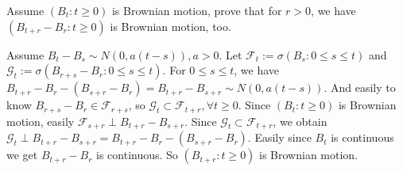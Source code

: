 \documentclass{ctexart}
\begin{document}
\begin{problem}\label{pro:1}
  Assume \((B_t:t \geq 0)\) is Brownian motion, prove that for \(r>0\), we have \((B_{t + r}-B_r:t \geq 0)\) is Brownian motion, too.
\end{problem}
\begin{solution}
  Assume \(B_t-B_s \sim N(0,a(t-s)),a >0\).
  Let \(\mathcal{F}_t:=\sigma(B_s:0 \leq s \leq t)\) and \(\mathcal{G}_t:=\sigma(B_{r+s}-B_r:0 \leq s \leq t)\).
  For \(0 \leq s \leq t\), we have \(B_{t+r}-B_r -(B_{s+r}-B_r)=B_{t+r}-B_{s+r} \sim N(0,a(t-s))\).
  And easily to know \(B_{r + s}-B_r \in \mathcal{F}_{r+s}\), so \(\mathcal{G}_t \subset \mathcal{F}_{t+r},\forall t \geq 0\).
  Since \((B_t:t \geq 0)\) is Brownian motion, easily \(\mathcal{F}_{s+r} \perp B_{t+r}-B_{s+r}\).
  Since \(\mathcal{G}_{t}\subset \mathcal{F}_{t +r}\), we obtain \(\mathcal{G}_t \perp B_{t + r}-B_{s + r}=B_{t+r}-B_r -(B_{s+r}-B_r)\).
  Easily since \(B_t\) is continuous we get \(B_{t + r}-B_r\) is continuous.
  So \((B_{t+r}:t \geq 0)\) is Brownian motion.
\end{solution}
\end{document}
